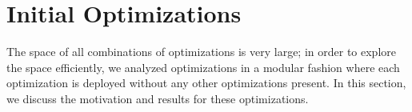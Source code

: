 \section{Initial Optimizations}\label{sec:opt}
The space of all combinations of optimizations is very large; in order to
explore the space efficiently, we analyzed optimizations in a modular fashion
where each optimization is deployed without any other optimizations present. In
this section, we discuss the motivation and results for these optimizations.
